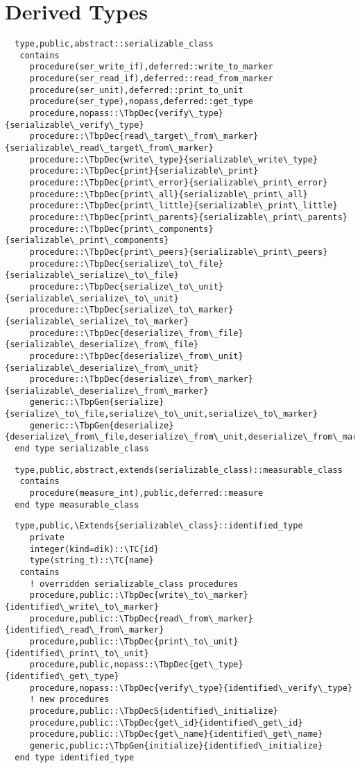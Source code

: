 \section{Derived Types}
\begin{Verbatim}
  type,public,abstract::serializable_class
   contains
     procedure(ser_write_if),deferred::write_to_marker
     procedure(ser_read_if),deferred::read_from_marker
     procedure(ser_unit),deferred::print_to_unit
     procedure(ser_type),nopass,deferred::get_type
     procedure,nopass::\TbpDec{verify\_type}{serializable\_verify\_type}
     procedure::\TbpDec{read\_target\_from\_marker}{serializable\_read\_target\_from\_marker}
     procedure::\TbpDec{write\_type}{serializable\_write\_type}
     procedure::\TbpDec{print}{serializable\_print}
     procedure::\TbpDec{print\_error}{serializable\_print\_error}
     procedure::\TbpDec{print\_all}{serializable\_print\_all}
     procedure::\TbpDec{print\_little}{serializable\_print\_little}
     procedure::\TbpDec{print\_parents}{serializable\_print\_parents}
     procedure::\TbpDec{print\_components}{serializable\_print\_components}
     procedure::\TbpDec{print\_peers}{serializable\_print\_peers}
     procedure::\TbpDec{serialize\_to\_file}{serializable\_serialize\_to\_file}
     procedure::\TbpDec{serialize\_to\_unit}{serializable\_serialize\_to\_unit}
     procedure::\TbpDec{serialize\_to\_marker}{serializable\_serialize\_to\_marker}
     procedure::\TbpDec{deserialize\_from\_file}{serializable\_deserialize\_from\_file}
     procedure::\TbpDec{deserialize\_from\_unit}{serializable\_deserialize\_from\_unit}
     procedure::\TbpDec{deserialize\_from\_marker}{serializable\_deserialize\_from\_marker}
     generic::\TbpGen{serialize}{serialize\_to\_file,serialize\_to\_unit,serialize\_to\_marker}
     generic::\TbpGen{deserialize}{deserialize\_from\_file,deserialize\_from\_unit,deserialize\_from\_marker}
  end type serializable_class
\end{Verbatim}
\begin{Verbatim}
  type,public,abstract,extends(serializable_class)::measurable_class
   contains
     procedure(measure_int),public,deferred::measure
  end type measurable_class
\end{Verbatim}
\begin{Verbatim}
  type,public,\Extends{serializable\_class}::identified_type 
     private
     integer(kind=dik)::\TC{id}
     type(string_t)::\TC{name}
   contains
     ! overridden serializable_class procedures
     procedure,public::\TbpDec{write\_to\_marker}{identified\_write\_to\_marker}
     procedure,public::\TbpDec{read\_from\_marker}{identified\_read\_from\_marker}
     procedure,public::\TbpDec{print\_to\_unit}{identified\_print\_to\_unit}
     procedure,public,nopass::\TbpDec{get\_type}{identified\_get\_type}
     procedure,nopass::\TbpDec{verify\_type}{identified\_verify\_type}
     ! new procedures
     procedure,public::\TbpDecS{identified\_initialize}
     procedure,public::\TbpDec{get\_id}{identified\_get\_id}
     procedure,public::\TbpDec{get\_name}{identified\_get\_name}
     generic,public::\TbpGen{initialize}{identified\_initialize}
  end type identified_type
\end{Verbatim}
